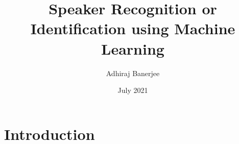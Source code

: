 \documentclass{article}
\title{Speaker Recognition or Identification using Machine Learning}
\author{Adhiraj Banerjee}
\date{July 2021}
\begin{document}
\maketitle

\section{Introduction}
\end{document}
